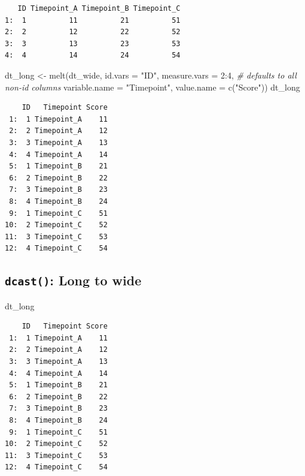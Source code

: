 \documentclass[
]{book}
\newenvironment{Shaded}{\begin{snugshade}}{\end{snugshade}}
\newcommand{\AttributeTok}[1]{\textcolor[rgb]{0.77,0.63,0.00}{#1}}
\newcommand{\CommentTok}[1]{\textcolor[rgb]{0.56,0.35,0.01}{\textit{#1}}}
\newcommand{\DecValTok}[1]{\textcolor[rgb]{0.00,0.00,0.81}{#1}}
\newcommand{\FunctionTok}[1]{\textcolor[rgb]{0.00,0.00,0.00}{#1}}
\newcommand{\NormalTok}[1]{#1}
\newcommand{\OtherTok}[1]{\textcolor[rgb]{0.56,0.35,0.01}{#1}}
\newcommand{\SpecialCharTok}[1]{\textcolor[rgb]{0.00,0.00,0.00}{#1}}
\newcommand{\StringTok}[1]{\textcolor[rgb]{0.31,0.60,0.02}{#1}}
\begin{document}
\begin{verbatim}
   ID Timepoint_A Timepoint_B Timepoint_C
1:  1          11          21          51
2:  2          12          22          52
3:  3          13          23          53
4:  4          14          24          54
\end{verbatim}

\begin{Shaded}
\begin{Highlighting}[]
\NormalTok{dt\_long }\OtherTok{\textless{}{-}} \FunctionTok{melt}\NormalTok{(dt\_wide, }\AttributeTok{id.vars =} \StringTok{"ID"}\NormalTok{,}
                \AttributeTok{measure.vars =} \DecValTok{2}\SpecialCharTok{:}\DecValTok{4}\NormalTok{, }\CommentTok{\# defaults to all non{-}id columns}
                \AttributeTok{variable.name =} \StringTok{"Timepoint"}\NormalTok{,}
                \AttributeTok{value.name =} \FunctionTok{c}\NormalTok{(}\StringTok{"Score"}\NormalTok{))}
\NormalTok{dt\_long}
\end{Highlighting}
\end{Shaded}

\begin{verbatim}
    ID   Timepoint Score
 1:  1 Timepoint_A    11
 2:  2 Timepoint_A    12
 3:  3 Timepoint_A    13
 4:  4 Timepoint_A    14
 5:  1 Timepoint_B    21
 6:  2 Timepoint_B    22
 7:  3 Timepoint_B    23
 8:  4 Timepoint_B    24
 9:  1 Timepoint_C    51
10:  2 Timepoint_C    52
11:  3 Timepoint_C    53
12:  4 Timepoint_C    54
\end{verbatim}

\hypertarget{dcast-long-to-wide}{%
\subsection{\texorpdfstring{\texttt{dcast()}: Long to wide}{dcast(): Long to wide}}\label{dcast-long-to-wide}}

\begin{Shaded}
\begin{Highlighting}[]
\NormalTok{dt\_long}
\end{Highlighting}
\end{Shaded}

\begin{verbatim}
    ID   Timepoint Score
 1:  1 Timepoint_A    11
 2:  2 Timepoint_A    12
 3:  3 Timepoint_A    13
 4:  4 Timepoint_A    14
 5:  1 Timepoint_B    21
 6:  2 Timepoint_B    22
 7:  3 Timepoint_B    23
 8:  4 Timepoint_B    24
 9:  1 Timepoint_C    51
10:  2 Timepoint_C    52
11:  3 Timepoint_C    53
12:  4 Timepoint_C    54
\end{verbatim}
\end{document}
